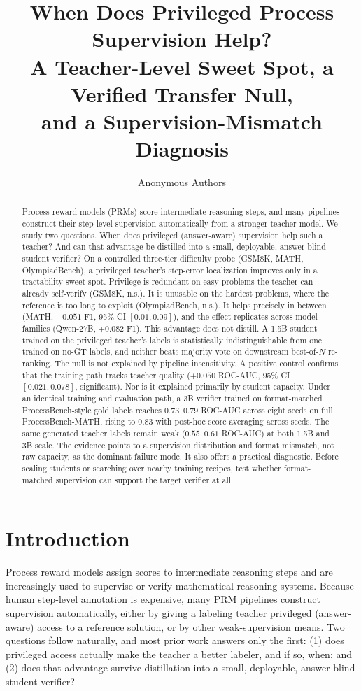\documentclass{article}
\title{When Does Privileged Process Supervision Help?\\
A Teacher-Level Sweet Spot, a Verified Transfer Null,\\
and a Supervision-Mismatch Diagnosis}
\author{Anonymous Authors}
\date{}
\begin{document}
\maketitle

\begin{abstract}
Process reward models (PRMs) score intermediate reasoning steps, and many
pipelines construct their step-level supervision automatically from a
stronger teacher model. We study two questions. When does privileged
(answer-aware) supervision help such a teacher? And can that advantage be
distilled into a small, deployable, answer-blind student verifier?
On a controlled three-tier difficulty probe (GSM8K, MATH, OlympiadBench), a
privileged teacher's step-error localization improves only in a tractability
sweet spot. Privilege is redundant on easy problems the teacher can already
self-verify (GSM8K, n.s.). It is unusable on the hardest problems, where the
reference is too long to exploit (OlympiadBench, n.s.). It helps precisely in
between (MATH, $+0.051$ F1, 95\% CI $[0.01, 0.09]$), and the effect replicates
across model families (Qwen-27B, $+0.082$ F1).
This advantage does not distill. A 1.5B student trained on the privileged
teacher's labels is statistically indistinguishable from one trained on no-GT
labels, and neither beats majority vote on downstream best-of-$N$ re-ranking.
The null is not explained by pipeline insensitivity. A positive control
confirms that the training path tracks teacher quality ($+0.050$ ROC-AUC,
95\% CI $[0.021, 0.078]$, significant). Nor is it explained primarily by
student capacity. Under an identical training and evaluation path, a 3B
verifier trained on format-matched ProcessBench-style gold labels reaches
$0.73$--$0.79$ ROC-AUC across eight seeds on full ProcessBench-MATH, rising to
$0.83$ with post-hoc score averaging across seeds. The same generated teacher
labels remain weak ($0.55$--$0.61$ ROC-AUC) at both 1.5B and 3B scale.
The evidence points to a supervision distribution and format mismatch, not raw
capacity, as the dominant failure mode. It also offers a practical diagnostic.
Before scaling students or searching over nearby training recipes, test
whether format-matched supervision can support the target verifier at all.
\end{abstract}

\section{Introduction}
\label{sec:intro}

Process reward models assign scores to intermediate reasoning steps and are
increasingly used to supervise or verify mathematical reasoning systems.
Because human step-level annotation is expensive, many PRM pipelines
construct supervision automatically, either by giving a labeling teacher
privileged (answer-aware) access to a reference solution, or by other
weak-supervision means. Two questions follow naturally, and most prior work
answers only the first: (1) does privileged access actually make the teacher
a better labeler, and if so, when; and (2) does that advantage survive
distillation into a small, deployable, answer-blind student verifier?
\end{document}
